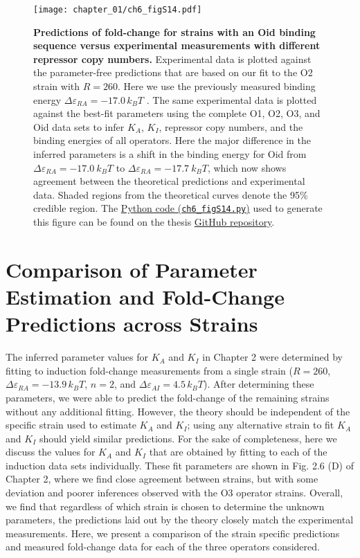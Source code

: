 \documentclass[12pt]{caltech_thesis}
\begin{document}
\hypertarget{fig:oid_refit}{%
\begin{figure}
\centering
\texttt{[image: chapter\_01/ch6\_figS14.pdf]}
\caption[{Predictions of fold-change for strains with an Oid binding
sequence versus experimental measurements with different repressor copy
numbers.}]{\textbf{Predictions of fold-change for strains with an Oid
binding sequence versus experimental measurements with different
repressor copy numbers.} Experimental data is plotted against the
parameter-free predictions that are based on our fit to the O2 strain
with \(R=260\). Here we use the previously measured binding energy
\(\Delta\varepsilon_{RA}=-17.0\,k_BT\) \autocite{garcia2011}. The same
experimental data is plotted against the best-fit parameters using the
complete O1, O2, O3, and Oid data sets to infer \(K_A\), \(K_I\),
repressor copy numbers, and the binding energies of all operators. Here
the major difference in the inferred parameters is a shift in the
binding energy for Oid from \(\Delta\varepsilon_{RA}=-17.0~k_BT\) to
\(\Delta\varepsilon_{RA}=-17.7~k_BT\), which now shows agreement between
the theoretical predictions and experimental data. Shaded regions from
the theoretical curves denote the 95\% credible region. The
\href{https://github.com/gchure/phd/blob/master/src/chapter_06/code/ch6_figS14.py}{Python
code (\texttt{ch6\_figS14.py})} used to generate this figure can be
found on the thesis \href{https://github.com/gchure/phd}{GitHub
repository}.}
\label{fig:oid_refit}
\end{figure}
}

\hypertarget{comparison-of-parameter-estimation-and-fold-change-predictions-across-strains}{%
\section{Comparison of Parameter Estimation and Fold-Change Predictions
across
Strains}\label{comparison-of-parameter-estimation-and-fold-change-predictions-across-strains}}

The inferred parameter values for \(K_A\) and \(K_I\) in Chapter 2 were
determined by fitting to induction fold-change measurements from a
single strain (\(R=260\), \(\Delta\varepsilon_{RA} = -13.9\,k_BT\),
\(n=2\), and \(\Delta\varepsilon_{AI}=4.5\,k_BT\)). After determining
these parameters, we were able to predict the fold-change of the
remaining strains without any additional fitting. However, the theory
should be independent of the specific strain used to estimate \(K_A\)
and \(K_I\); using any alternative strain to fit \(K_A\) and \(K_I\)
should yield similar predictions. For the sake of completeness, here we
discuss the values for \(K_A\) and \(K_I\) that are obtained by fitting
to each of the induction data sets individually. These fit parameters
are shown in Fig. 2.6 (D) of Chapter 2, where we find close agreement
between strains, but with some deviation and poorer inferences observed
with the O3 operator strains. Overall, we find that regardless of which
strain is chosen to determine the unknown parameters, the predictions
laid out by the theory closely match the experimental measurements.
Here, we present a comparison of the strain specific predictions and
measured fold-change data for each of the three operators considered.
\end{document}
